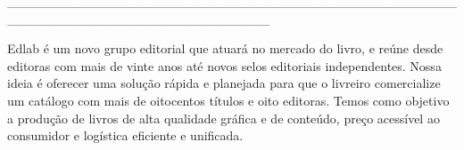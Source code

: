 \pagestyle{indice}

\vspace*{.5cm}

{}

\vspace{.5cm}

{}


\hspace*{-2cm}\_\_\_\_\_\_\_\_\_\_\_\_\_\_\_\_\_\_\_\_\_\_\_\_\_\_\_\_\_\_\_\_\_\_\_\_\_\_\_\_\_\_\_\_\_\_\_\_\_\_\_\_\_\_\_\_\_\_\_\_\_\_\_\_\_\_\_\_\_\_\_\_\_\_\_\_

\vspace{1cm}

\hspace*{-.5cm}\parbox{150pt}{\raggedright Edlab é um novo grupo editorial que atuará no mercado do livro, e reúne desde editoras com mais de vinte anos até novos selos editoriais independentes. Nossa ideia é oferecer uma solução rápida e planejada para que o livreiro comercialize um catálogo com mais de oitocentos títulos e oito editoras. Temos como objetivo a produção de livros de alta qualidade gráfica e de conteúdo, preço acessível ao consumidor e logística eficiente e unificada.} %

